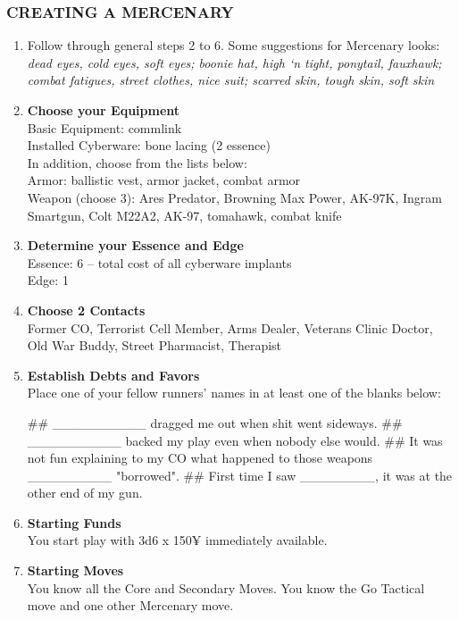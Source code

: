 \subsubsection{CREATING A MERCENARY}
\begin{enumerate}
    \item Follow through general steps 2 to 6. Some suggestions for Mercenary looks: \textit{dead eyes, cold eyes, soft eyes; boonie hat, high ‘n tight, ponytail, fauxhawk; combat fatigues, street clothes, nice suit; scarred skin, tough skin, soft skin}
    
    \item \textbf{Choose your Equipment} \\
    Basic Equipment: commlink \\
    Installed Cyberware: bone lacing (2 essence) \\
    In addition, choose from the lists below: \\
    Armor: ballistic vest, armor jacket, combat armor \\
    Weapon (choose 3): Ares Predator, Browning Max Power, AK-97K, Ingram Smartgun, Colt M22A2, AK-97, tomahawk, combat knife
    
    \item \textbf{Determine your Essence and Edge} \\
    Essence: 6 – total cost of all cyberware implants \\ Edge: 1
    
    \item \textbf{Choose 2 Contacts} \\
    Former CO, Terrorist Cell Member, Arms Dealer, Veterans Clinic Doctor, Old War Buddy, Street Pharmacist, Therapist
    
    \item \textbf{Establish Debts and Favors} \\
    Place one of your fellow runners’ names in at least one of the blanks below:
        \begin{easylist}
            ## \_\_\_\_\_\_\_\_\_\_ dragged me out when shit went sideways.
            ## \_\_\_\_\_\_\_\_\_\_ backed my play even when nobody else would.
            ## It was not fun explaining to my CO what happened to those weapons \_\_\_\_\_\_\_\_\_ "borrowed".
            ## First time I saw \_\_\_\_\_\_\_\_, it was at the other end of my gun.
        \end{easylist}
    
    \item \textbf{Starting Funds} \\
    You start play with 3d6 x 150¥ immediately available.
    
    \item \textbf{Starting Moves} \\
    You know all the Core and Secondary Moves. You know the Go Tactical move and one other Mercenary move.
\end{enumerate}

